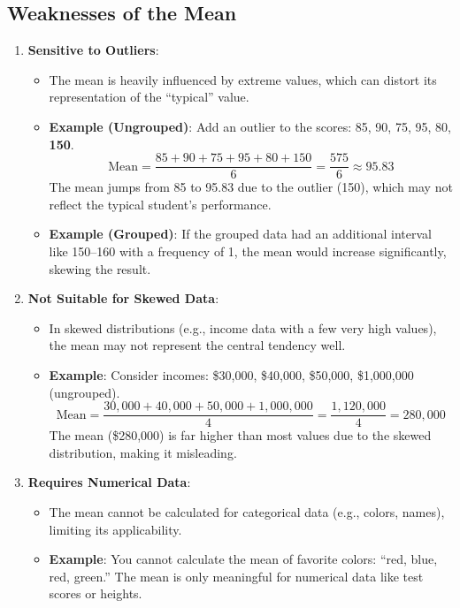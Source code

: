 \documentclass[11pt]{article}
\begin{document}
\subsection*{Weaknesses of the Mean}

\begin{enumerate}
    \item \textbf{Sensitive to Outliers}:
    \begin{itemize}
        \item The mean is heavily influenced by extreme values, which can distort its representation of the “typical” value.
        \item \textbf{Example (Ungrouped)}: Add an outlier to the scores: 85, 90, 75, 95, 80, \textbf{150}.
        \[
        \text{Mean} = \frac{85 + 90 + 75 + 95 + 80 + 150}{6} = \frac{575}{6} \approx 95.83
        \]
        The mean jumps from 85 to 95.83 due to the outlier (150), which may not reflect the typical student’s performance.
        \item \textbf{Example (Grouped)}: If the grouped data had an additional interval like 150--160 with a frequency of 1, the mean would increase significantly, skewing the result.
    \end{itemize}

    \item \textbf{Not Suitable for Skewed Data}:
    \begin{itemize}
        \item In skewed distributions (e.g., income data with a few very high values), the mean may not represent the central tendency well.
        \item \textbf{Example}: Consider incomes: \$30,000, \$40,000, \$50,000, \$1,000,000 (ungrouped).
        \[
        \text{Mean} = \frac{30,000 + 40,000 + 50,000 + 1,000,000}{4} = \frac{1,120,000}{4} = 280,000
        \]
        The mean (\$280,000) is far higher than most values due to the skewed distribution, making it misleading.
    \end{itemize}

    \item \textbf{Requires Numerical Data}:
    \begin{itemize}
        \item The mean cannot be calculated for categorical data (e.g., colors, names), limiting its applicability.
        \item \textbf{Example}: You cannot calculate the mean of favorite colors: “red, blue, red, green.” The mean is only meaningful for numerical data like test scores or heights.
    \end{itemize}


\end{enumerate}
\end{document}

